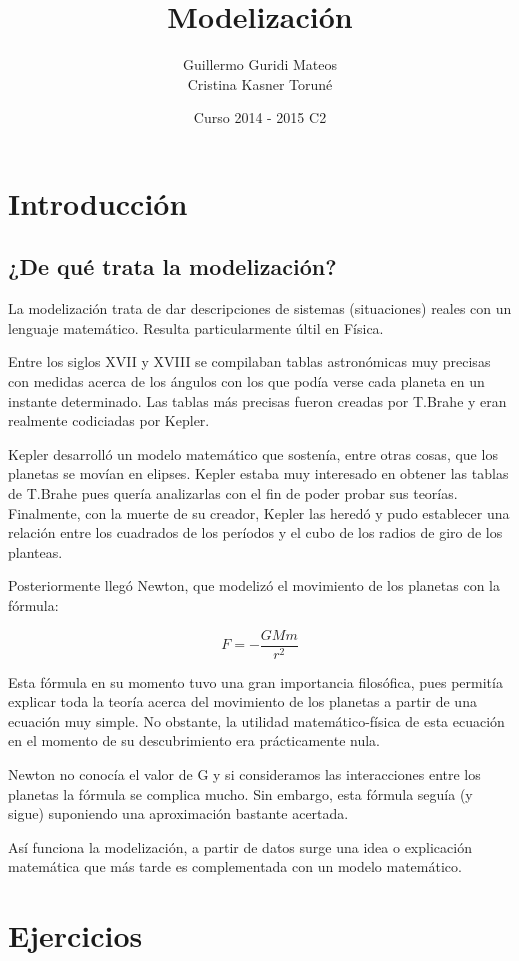 \documentclass{apuntes}
\title{Modelización}
\author{Guillermo Guridi Mateos\\Cristina Kasner Toruné}
\date{Curso 2014 - 2015 C2}
\begin{document}
\pagestyle{plain}
\maketitle

\tableofcontents
\newpage

\chapter{Introducción}

\section{¿De qué trata la modelización?}

La modelización trata de dar descripciones de sistemas (situaciones) reales con un lenguaje matemático. Resulta particularmente últil en Física.

Entre los siglos XVII y XVIII se compilaban tablas astronómicas muy precisas con medidas acerca de los ángulos con los que podía verse cada planeta en un instante determinado. Las tablas más precisas fueron creadas por T.Brahe y eran realmente codiciadas por Kepler.

Kepler desarrolló un modelo matemático que sostenía, entre otras cosas, que los planetas se movían en elipses. Kepler estaba muy interesado en obtener las tablas de T.Brahe pues quería analizarlas con el fin de poder probar sus teorías. Finalmente, con la muerte de su creador, Kepler las heredó y pudo establecer una relación entre los cuadrados de los períodos y el cubo de los radios de giro de los planteas.

Posteriormente llegó Newton, que modelizó el movimiento de los planetas con la fórmula:

$$F = - \frac{GMm}{r^2}$$

Esta fórmula en su momento tuvo una gran importancia filosófica, pues permitía explicar toda la teoría acerca del movimiento de los planetas a partir de una ecuación muy simple. No obstante, la utilidad matemático-física de esta ecuación en el momento de su descubrimiento era prácticamente nula.

Newton no conocía el valor de G y si consideramos las interacciones entre los planetas la fórmula se complica mucho. Sin embargo, esta fórmula seguía (y sigue) suponiendo una aproximación bastante acertada.

Así funciona la modelización, a partir de datos surge una idea o explicación matemática que más tarde es complementada con un modelo matemático.







\appendix

\chapter{Ejercicios}

\printindex
\end{document}
